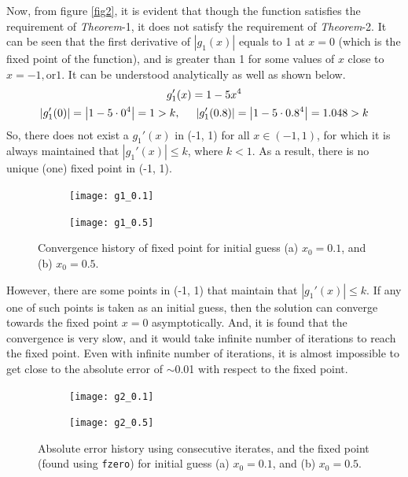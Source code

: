 \documentclass[11pt]{article} %
\begin{document}
Now, from figure \ref{fig2}, it is evident that though the function satisfies the requirement of \textit{Theorem}-1, it does not satisfy the requirement of \textit{Theorem}-2. It can be seen that the first derivative of $\left|g_1(x)\right|$ equals to 1 at $x = 0$ (which is the fixed point of the function), and is greater than 1 for some values of $x$ close to $x = -1, \text{or}  1$. It can be understood analytically as well as shown below.
\begin{equation}
\begin{gathered}
g_1'(x) = 1 - 5x^4\\
\left|g_1'(0)\right| = \left|1 - 5\cdot 0^4\right| = 1 > k,\hspace{0.5cm}
\left|g_1'(0.8)\right| = \left|1 - 5\cdot 0.8^4\right| = 1.048 > k
\label{eq8}
\end{gathered}
\end{equation}
So, there does not exist a $g_1'(x)$ in (-1, 1) for all $x \in (-1, 1)$, for which it is always maintained that $\left|g_1'(x)\right| \leq k$, where $k < 1$. As a result, there is no unique (one) fixed point in (-1, 1).
\begin{figure}[!htb]
    \centering
    \begin{subfigure}{.5\textwidth}
        \centering
        \texttt{[image: g1\_0.1]}
        \caption{}
        \label{fig3a}
    \end{subfigure}\hfill
    \begin{subfigure}{0.5\textwidth}
        \centering
        \texttt{[image: g1\_0.5]}
        \caption{}
        \label{fig3b}
    \end{subfigure}
    \caption{Convergence history of fixed point for initial guess (a) $x_0 = 0.1$, and (b) $x_0 = 0.5$.}
    \label{fig3}
\end{figure}
However, there are some points in (-1, 1) that maintain that $\left|g_1'(x)\right| \leq k$. If any one of such points is taken as an initial guess, then the solution can converge towards the fixed point $x = 0$ asymptotically. And, it is found that the convergence is very slow, and it would take infinite number of iterations to reach the fixed point. Even with infinite number of iterations, it is almost impossible to get close to the absolute error of $\sim$0.01 with respect to the fixed point.
\begin{figure}[!htb]
    \centering
    \begin{subfigure}{.5\textwidth}
        \centering
        \texttt{[image: g2\_0.1]}
        \caption{}
        \label{fig4a}
    \end{subfigure}\hfill
    \begin{subfigure}{0.5\textwidth}
        \centering
        \texttt{[image: g2\_0.5]}
        \caption{}
        \label{fig4b}
    \end{subfigure}
    \caption{Absolute error history using consecutive iterates, and the fixed point (found using \texttt{fzero}) for initial guess (a) $x_0 = 0.1$, and (b) $x_0 = 0.5$.}
    \label{fig4}
\end{figure}
\end{document}
